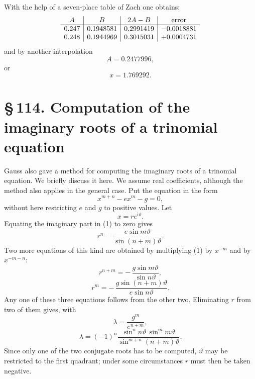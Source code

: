 \documentclass[11pt]{article}
\providecommand{\ii}{\mathrm{i}}
\providecommand{\sect}[2]{\section*{\S\,#1. #2}}
\begin{document}
With the help of a seven-place table of Zach one obtains:
\[
\begin{array}{c|c|c|c}
A&B&2A-B&\hbox{error}\\ \hline
0.247&0.1948581&0.2991419&-0.0018881\\
0.248&0.1944969&0.3015031&+0.0004731
\end{array}
\]
and by another interpolation
\[
        A=0.2477996,
\]
or
\[
        x=1.769292.
\]

\sect{114}{Computation of the imaginary roots of a trinomial equation}

Gauss also gave a method for computing the imaginary roots of a trinomial equation. We briefly discuss it here. We assume real coefficients, although the method also applies in the general case. Put the equation in the form
\begin{equation}
        x^{m+n}-ex^m-g=0,
\tag{1}
\end{equation}
without here restricting $e$ and $g$ to positive values. Let
\[
        x=re^{\ii\vartheta}.
\]
Equating the imaginary part in (1) to zero gives
\begin{equation}
        r^n=\frac{e\sin m\vartheta}{\sin(n+m)\vartheta}.
\tag{2}
\end{equation}
Two more equations of this kind are obtained by multiplying (1) by $x^{-m}$ and by $x^{-m-n}$:
\begin{equation}
        r^{n+m}=-\,\frac{g\sin m\vartheta}{\sin n\vartheta},
\tag{3}
\end{equation}
\begin{equation}
        r^m=-\,\frac{g\sin(n+m)\vartheta}{e\sin n\vartheta}.
\tag{4}
\end{equation}
Any one of these three equations follows from the other two. Eliminating $r$ from two of them gives, with
\[
        \lambda=\frac{g^m}{e^{n+m}},
\]
\begin{equation}
        \lambda=(-1)^n
        \frac{\sin^n n\vartheta\,\sin^m m\vartheta}
             {\sin^{m+n}(n+m)\vartheta}.
\tag{5}
\end{equation}
Since only one of the two conjugate roots has to be computed, $\vartheta$ may be restricted to the first quadrant; under some circumstances $r$ must then be taken negative.
\end{document}
